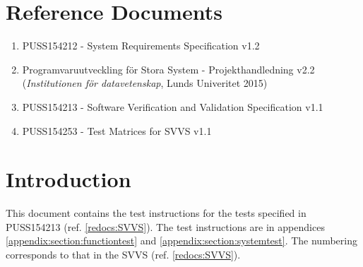 \documentclass[a4paper]{article}
\begin{document}
\setcounter{tocdepth}{2}
\tableofcontents
\newpage
{}


\section{Reference Documents}
\begin{enumerate}
\item PUSS154212 - System Requirements Specification v1.2 \label{refdocs:srs} 
\item Programvaruutveckling för Stora System - Projekthandledning v2.2 \newline (\textit{Institutionen för datavetenskap}, Lunds Univeritet 2015) \label{refdocs:projekthandledning}
\item PUSS154213 - Software Verification and Validation Specification v1.1 \label{redocs:SVVS}
\item PUSS154253 - Test Matrices for SVVS v1.1 \label{refdocs:matrices}
\end{enumerate}

\section{Introduction}
This document contains the test instructions for the tests specified in PUSS154213 (ref. \ref{redocs:SVVS}). The test instructions are in appendices \ref{appendix:section:functiontest} and \ref{appendix:section:systemtest}. The numbering corresponds to that in the SVVS (ref. \ref{redocs:SVVS}).
\end{document}

